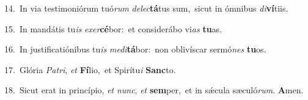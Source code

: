 {\numbfont\textcolor{\numbcolor}{14.}}~In via testimoniórum tuó\textit{rum} \textit{de}\-\textit{lec}\textbf{tá}tus sum,~\star sicut in ómnibus \textit{di}\-\textbf{ví}tiis.\par
{\numbfont\textcolor{\numbcolor}{15.}}~In mandátis tu\textit{is} \textit{ex}\-\textit{er}\textbf{cé}bor:~\star et considerábo vi\textit{as} \textbf{tu}\-as.\par
{\numbfont\textcolor{\numbcolor}{16.}}~In justificatiónibus tu\textit{is} \textit{me}\-\textit{di}\textbf{tá}bor:~\star non oblivíscar sermó\textit{nes} \textbf{tu}\-os.\par
{\numbfont\textcolor{\numbcolor}{17.}}~Glória \textit{Pa}\-\textit{tri}, \textit{et} \textbf{Fí}\-lio,~\star et Spirítu\textit{i} \textbf{Sanc}\-to.\par
{\numbfont\textcolor{\numbcolor}{18.}}~Sicut erat in princípio, \textit{et} \textit{nunc}\-, \textit{et} \textbf{sem}\-per,~\star et in sǽcula sæculó\-\textit{rum}\-. \textbf{A}\-men.\par
